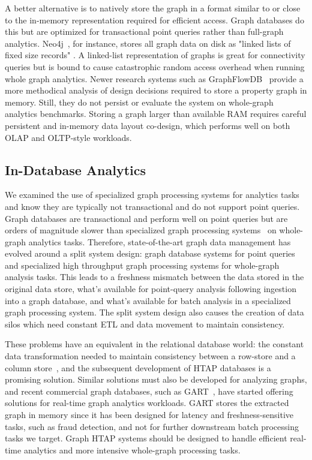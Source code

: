 A better alternative is to natively store the graph in a format similar to or close to the in-memory representation required for efficient access.
Graph databases do this but are optimized for transactional point queries rather than full-graph analytics.
Neo4j~\cite{neo4j}, for instance, stores all graph data on disk as "linked lists of fixed size records" \cite{neo4j:data_layout:2024}.
A linked-list representation of graphs is great for connectivity queries but is bound to cause catastrophic random access overhead when running whole graph analytics.
Newer research systems such as GraphFlowDB~\cite{graphflowdb2021Gupta} provide a more methodical analysis of design decisions required to store a property graph in memory. Still, they do not persist or evaluate the system on whole-graph analytics benchmarks.
Storing a graph larger than available RAM requires careful persistent and in-memory data layout co-design, which performs well on both OLAP and OLTP-style workloads.

\subsection{In-Database Analytics}
We examined the use of specialized graph processing systems for analytics tasks and know they are typically not transactional and do not support point queries.
Graph databases are transactional and perform well on point queries but are orders of magnitude slower than specialized graph processing systems~\cite{SpecializedGDB-Waterloo} on whole-graph analytics tasks.
Therefore, state-of-the-art graph data management has evolved around a split system design: graph database systems for point queries and specialized high throughput graph processing systems for whole-graph analysis tasks.
This leads to a freshness mismatch between the data stored in the original data store, what's available for point-query analysis following ingestion into a graph database, and what's available for batch analysis in a specialized graph processing system.
The split system design also causes the creation of data silos which need constant \ac{ETL} and data movement to maintain consistency.

These problems have an equivalent in the relational database world: the constant data transformation needed to maintain consistency between a row-store and a column store~\cite{HTAP2016ArchepelagoArulraj}, and the subsequent development of \ac{HTAP} databases is a promising solution.
Similar solutions must also be developed for analyzing graphs, and recent commercial graph databases, such as GART~\cite{shen2023bridging}, have started offering solutions for real-time graph analytics workloads.
GART stores the extracted graph in memory since it has been designed for latency and freshness-sensitive tasks, such as fraud detection, and not for further downstream batch processing tasks we target.
Graph \ac{HTAP} systems should be designed to handle efficient real-time analytics and more intensive whole-graph processing tasks.

